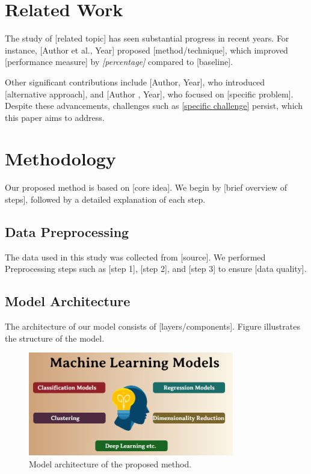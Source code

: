\documentclass{article}
\begin{document}
\section{Related Work}
The study of [related topic] has seen substantial progress in recent years. For instance, [Author et al., Year] proposed [method/technique], which improved [performance measure] by \textit{[percentage]} compared to [baseline].

Other significant contributions include [Author, Year], who introduced [alternative approach], and [Author , Year], who focused on [specific problem]. Despite these advancements, challenges such as \underline{[specific challenge]} persist, which this paper aims to address.

\section{Methodology}
Our proposed method is based on [core idea]. We begin by [brief overview of steps], followed by a detailed explanation of each step.

\subsection{Data Preprocessing}
The data used in this study was collected from [source]. We performed Preprocessing steps such as [step 1], [step 2], and [step 3] to ensure [data quality].

\subsection{Model Architecture}
The architecture of our model consists of [layers/components]. Figure illustrates the structure of the model.

\begin{figure}[h]
    \centering
    \includegraphics[width=0.8\textwidth]{2.png}
    \caption{Model architecture of the proposed method.}
    \label{fig:architecture}
\end{figure}
\end{document}
